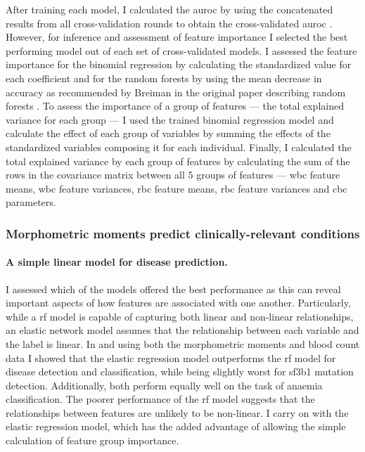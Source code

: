After training each model, I calculated the \ac{auroc} by using the concatenated results from all cross-validation rounds to obtain the cross-validated \ac{auroc} \cite{Fawcett2006-mo}. However, for inference and assessment of feature importance I selected the best performing model out of each set of cross-validated models. I assessed the feature importance for the binomial regression by calculating the standardized value for each coefficient and for the random forests by using the mean decrease in accuracy as recommended by Breiman in the original paper describing random forests \cite{Breiman2001-yz}. To assess the importance of a group of features --- the total explained variance for each group --- I used the trained binomial regression model and calculate the effect of each group of variables by summing the effects of the standardized variables composing it for each individual. Finally, I calculated the total explained variance by each group of features by calculating the sum of the rows in the covariance matrix between all 5 groups of features --- \ac{wbc} feature means, \ac{wbc} feature variances, \ac{rbc} feature means, \ac{rbc} feature variances and \ac{cbc} parameters.

\subsubsection{Morphometric moments predict clinically-relevant conditions}

\paragraph{A simple linear model for disease prediction.} I assessed which of the models offered the best performance as this can reveal important aspects of how features are associated with one another. Particularly, while a \ac{rf} model is capable of capturing both linear and non-linear relationships, an elastic network model assumes that the relationship between each variable and the label is linear. In  and using both the morphometric moments and blood count data I showed that the elastic regression model outperforms the \ac{rf} model for disease detection and classification, while being slightly worst for \ac{sf3b1} mutation detection. Additionally, both perform equally well on the task of anaemia classification. The poorer performance of the \ac{rf} model suggests that the relationships between features are unlikely to be non-linear. I carry on with the elastic regression model, which has the added advantage of allowing the simple calculation of feature group importance.


